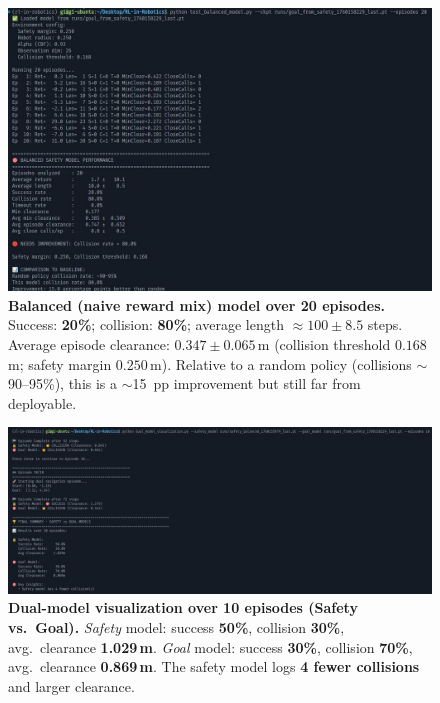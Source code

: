 \documentclass[10pt,conference]{IEEEtran}
\begin{document}
\begin{figure}[h!]
    \centering
    \includegraphics[width=\columnwidth]{images/goal_to_safety_model.jpeg}
    \caption{\textbf{Balanced (naive reward mix) model over 20 episodes.}
    Success: \textbf{20\%}; collision: \textbf{80\%}; average length $\approx 100\pm 8.5$ steps.
    Average episode clearance: $0.347\pm 0.065$\,m (collision threshold $0.168$\,m; safety margin $0.250$\,m).
    Relative to a random policy (collisions $\sim$90--95\%), this is a $\sim$15~pp improvement but still far from deployable.}
    \label{fig:balanced_model_perf}
\end{figure}

\begin{figure}[h!]
    \centering
    \includegraphics[width=\columnwidth]{images/safety_vs_goal_final.jpeg}
    \caption{\textbf{Dual-model visualization over 10 episodes (Safety vs.\ Goal).}
    \emph{Safety} model: success \textbf{50\%}, collision \textbf{30\%}, avg.\ clearance \textbf{1.029\,m}.
    \emph{Goal} model: success \textbf{30\%}, collision \textbf{70\%}, avg.\ clearance \textbf{0.869\,m}.
    The safety model logs \textbf{4 fewer collisions} and larger clearance.}
    \label{fig:safety_vs_goal_final}
\end{figure}
\end{document}
